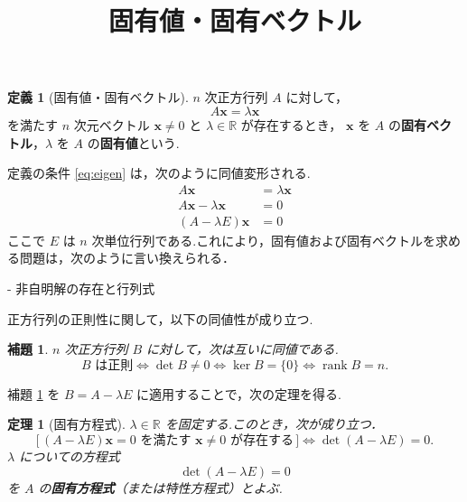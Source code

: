 \documentclass[11pt,a4paper]{article}
\title{固有値・固有ベクトル}
\author{}
\date{}
\theoremstyle{definition}
\newtheorem{definition}{定義}
\theoremstyle{plain}
\newtheorem{theorem}{定理}
\newtheorem{lemma}{補題}
\theoremstyle{remark}
\newcommand{\R}{\mathbb{R}}
\newcommand{\rank}{\operatorname{rank}}
\begin{document}
\maketitle


\begin{definition}[固有値・固有ベクトル]
$n$ 次正方行列 $A$ に対して，
\begin{equation}
    A\mathbf{x} = \lambda \mathbf{x} \tag{$\ast$}\label{eq:eigen}
\end{equation}
を満たす $n$ 次元ベクトル $\mathbf{x} \neq 0$ と $\lambda \in \R$ が存在するとき，
$\mathbf{x}$ を $A$ の\textbf{固有ベクトル}，$\lambda$ を $A$ の\textbf{固有値}という.
\end{definition}



定義の条件 \eqref{eq:eigen} は，次のように同値変形される.
\begin{align}
  A\mathbf{x} &= \lambda \mathbf{x} \tag{$\ast$} \\
  A\mathbf{x} - \lambda \mathbf{x} &= 0 \tag{$\ast_1$} \\
  (A - \lambda E)\mathbf{x} &= 0 \tag{$\ast_2$}
\end{align}
ここで $E$ は $n$ 次単位行列である.これにより，固有値および固有ベクトルを求める問題は，次のように言い換えられる．

\begin{center}
\end{center}
\fi

- 非自明解の存在と行列式

正方行列の正則性に関して，以下の同値性が成り立つ.

\begin{lemma}\label{lem:reg}
$n$ 次正方行列 $B$ に対して，次は互いに同値である.
\[
  B \text{ は正則}
  \iff \det B \neq 0
  \iff \ker B = \{0\}
  \iff \rank B = n.
\]
\end{lemma}

補題 \ref{lem:reg} を $B = A - \lambda E$ に適用することで，次の定理を得る.

\begin{theorem}[固有方程式]\label{thm:char}
$\lambda \in \R$ を固定する.このとき，次が成り立つ．
\[
  \bigl[\,(A - \lambda E)\mathbf{x} = 0 \text{ を満たす } \mathbf{x} \neq 0 \text{ が存在する}\,\bigr]
  \iff
  \det(A - \lambda E) = 0.
\]
$\lambda$ についての方程式
\begin{equation}
  \det(A - \lambda E) = 0 \tag{$\bigstar$}\label{eq:char}
\end{equation}
を $A$ の\textbf{固有方程式}（または特性方程式）とよぶ.
\end{theorem}
\end{document}
